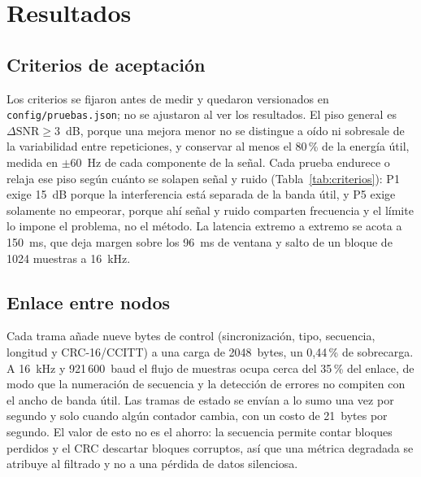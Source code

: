 \section{Resultados}
\label{sec:resultados}

\subsection{Criterios de aceptación}
Los criterios se fijaron antes de medir y quedaron versionados en
\texttt{config/pruebas.json}; no se ajustaron al ver los resultados. El piso
general es $\Delta\mathrm{SNR}\geq3$~dB, porque una mejora menor no se distingue
a oído ni sobresale de la variabilidad entre repeticiones, y conservar al menos
el 80\,\% de la energía útil, medida en $\pm60$~Hz de cada componente de la
señal. Cada prueba endurece o relaja ese piso según cuánto se solapen señal y
ruido (Tabla~\ref{tab:criterios}): P1 exige 15~dB porque la interferencia está
separada de la banda útil, y P5 exige solamente no empeorar, porque ahí señal y
ruido comparten frecuencia y el límite lo impone el problema, no el método. La
latencia extremo a extremo se acota a 150~ms, que deja margen sobre los 96~ms de
ventana y salto de un bloque de 1024 muestras a 16~kHz.

\begin{table}[t]
\caption{Criterios de aceptación fijados antes de medir.}
\label{tab:criterios}
\centering\small
{}
  {}
  {}
\end{table}

\subsection{Enlace entre nodos}
Cada trama añade nueve bytes de control (sincronización, tipo, secuencia,
longitud y CRC-16/CCITT) a una carga de 2048~bytes, un 0,44\,\% de sobrecarga.
A 16~kHz y 921\,600~baud el flujo de muestras ocupa cerca del 35\,\% del enlace,
de modo que la numeración de secuencia y la detección de errores no compiten con
el ancho de banda útil. Las tramas de estado se envían a lo sumo una vez por
segundo y solo cuando algún contador cambia, con un costo de 21~bytes por
segundo. El valor de esto no es el ahorro: la secuencia permite contar bloques
perdidos y el CRC descartar bloques corruptos, así que una métrica degradada se
atribuye al filtrado y no a una pérdida de datos silenciosa.

